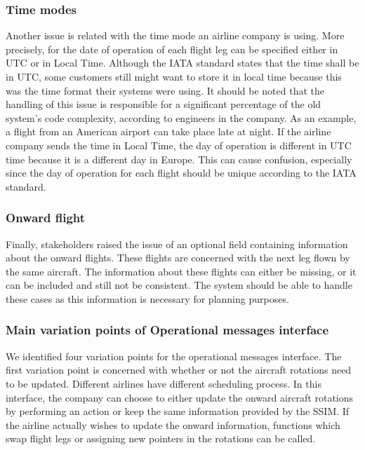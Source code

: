 \subsubsection{Time modes }
Another issue is related with the time mode an airline company is using. More precisely, for the date of operation of each flight leg can be specified either in UTC or in Local Time. Although the IATA standard states that the time shall be in UTC, some customers still might want to store it in local time because this was the time format their systems were using. It should be noted that the handling of this issue is responsible for a significant percentage of the old system's code complexity, according to engineers in the company. As an example, a flight from an American airport can take place late at night. If the airline company sends the time in Local Time, the day of operation is different in UTC time because it is a different day in Europe. This can cause confusion, especially since the day of operation for each flight should be unique according to the IATA standard.

\subsubsection{Onward flight}
Finally, stakeholders raised the issue of an optional field containing information about the onward flights. These flights are concerned with the next leg flown by the same aircraft. The information about these flights can either be missing, or it can be included and still not be consistent. The system should be able to handle these cases as this information is necessary for planning purposes. 





\subsubsection{Main variation points of Operational messages interface }
We identified four variation points for the operational messages interface. 
The first variation point is concerned with whether or not the aircraft rotations need to be updated.  Different airlines have different scheduling process. In this interface, the company can choose to either update the onward aircraft rotations by performing an action or keep the same information provided by the SSIM. If the airline actually wishes to update the onward information, functions which swap flight legs or assigning new pointers in the rotations can be called. 

